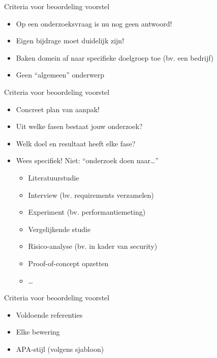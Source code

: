 \documentclass[aspectratio=169]{beamer}
\begin{document}
\begin{frame}{Criteria voor beoordeling voorstel}
  
  
  \begin{itemize}
    \item Op een onderzoeksvraag is nu nog geen antwoord!
    \item Eigen bijdrage moet duidelijk zijn!
    \item Baken domein af naar specifieke doelgroep toe (bv. een bedrijf)
    \item Geen ``algemeen'' onderwerp
  \end{itemize}
  
\end{frame}

\begin{frame}{Criteria voor beoordeling voorstel}
  
  
  \begin{itemize}
    \item Concreet plan van aanpak!
    \item Uit welke fasen bestaat jouw onderzoek?
    \item Welk doel en resultaat heeft elke fase?
    \item Wees specifiek! Niet: ``onderzoek doen naar\ldots''
    \begin{itemize}
      \item Literatuurstudie
      \item Interview (bv. requirements verzamelen)
      \item Experiment (bv. performantiemeting)
      \item Vergelijkende studie
      \item Risico-analyse (bv. in kader van security)
      \item Proof-of-concept opzetten
      \item \ldots
    \end{itemize}
  \end{itemize}
  
\end{frame}

\begin{frame}{Criteria voor beoordeling voorstel}
  
  
  \begin{itemize}
    \item Voldoende referenties
    \item Elke bewering
    \item APA-stijl (volgens sjabloon)
  \end{itemize}
  
\end{frame}
\end{document}
